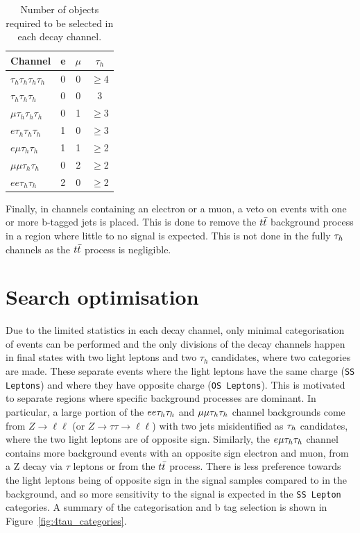 \begin{table}[!hbtp]
   \centering
   \begin{tabular}{|l|c|c|c|}
   \hline
   \multicolumn{1}{|c|}{Channel} & e & $\mu$ & $\tau_h$ \\ \hline \hline
   $\tau_h \tau_h \tau_h \tau_h$ & 0 & 0     & $\geq$4        \\
   $\tau_h \tau_h \tau_h$        & 0 & 0     & 3        \\ 
   $\mu \tau_h \tau_h \tau_h$    & 0 & 1     & $\geq$3        \\
   $e \tau_h \tau_h \tau_h$      & 1 & 0     & $\geq$3        \\
   $e \mu \tau_h \tau_h$         & 1 & 1     & $\geq$2        \\
   $\mu \mu \tau_h \tau_h$       & 0 & 2     & $\geq$2        \\
   $e e \tau_h \tau_h$           & 2 & 0     & $\geq$2        \\ \hline
   \end{tabular}
   \caption[Number of objects required to be selected in each decay channel.]{Number of objects required to be selected in each decay channel.}
   \label{tab:leptonvetoes}
\end{table}

Finally, in channels containing an electron or a muon, a veto on events with one or more b-tagged jets is placed.
This is done to remove the $t\bar{t}$ background process in a region where little to no signal is expected.
This is not done in the fully $\tau_{h}$ channels as the $t\bar{t}$ process is negligible. \\

\section{Search optimisation}

Due to the limited statistics in each decay channel, only minimal categorisation of events can be performed and the only divisions of the decay channels happen in final states with two light leptons and two $\tau_h$ candidates, where two categories are made.
These separate events where the light leptons have the same charge (\texttt{SS Leptons}) and where they have opposite charge (\texttt{OS Leptons}).
This is motivated to separate regions where specific background processes are dominant.
In particular, a large portion of the $ee\tau_{h}\tau_{h}$ and $\mu\mu\tau_{h}\tau_{h}$ channel backgrounds come from $Z\rightarrow \ell\ell$ (or $Z\rightarrow\tau\tau\rightarrow \ell\ell$) with two jets misidentified as $\tau_{h}$ candidates, where the two light leptons are of opposite sign.
Similarly, the $e\mu\tau_{h}\tau_{h}$ channel contains more background events with an opposite sign electron and muon, from a Z decay via $\tau$ leptons or from the $t\bar{t}$ process.
There is less preference towards the light leptons being of opposite sign in the signal samples compared to in the background, and so more sensitivity to the signal is expected in the \texttt{SS Lepton} categories. 
A summary of the categorisation and b tag selection is shown in Figure~\ref{fig:4tau_categories}. \\

